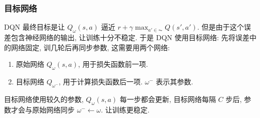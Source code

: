 \subsubsection{目标网络}
DQN 最终目标是让 $Q_\omega (s,a)$ 逼近 $r+\gamma \max_{a'\in\AC}Q(s',a')$. 但是由于这个误差包含神经网络的输出, 让训练十分不稳定. 于是 DQN 使用目标网络: 先将误差中的网络固定, 训几轮后再同步参数, 这需要用两个网络:
\begin{enumerate}
    \item 原始网络 $Q_\omega(s,a)$, 用于损失函数前一项.
    \item 目标网络 $Q_{\omega^-}$, 用于计算损失函数后一项. $\omega^-$ 表示其参数. 
\end{enumerate}
目标网络使用较久的参数, $Q_\omega(s,a)$ 每一步都会更新, 目标网络每隔 $C$ 步后, 参数才会与原始网络同步 $\omega^-\leftarrow \omega$. 让训练更稳定.





